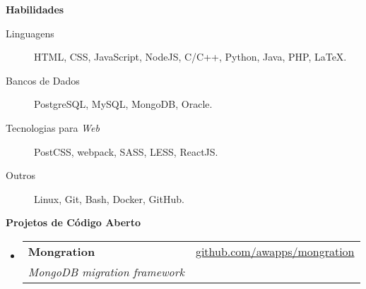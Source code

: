 \documentclass[letterpaper,11pt]{article}
\makeatletter
\newcommand{\resheading}[1]{{\large \colorbox{mygrey}{\begin{minipage}{\textwidth}{\textbf{#1 \vphantom{p\^{E}}}}\end{minipage}}}}
\newcommand{\ressubheading}[4]{
\begin{tabular*}{7.0in}{l@{\extracolsep{\fill}}r}
    \textbf{#1} & #2 \\
    \textit{#3} & \textit{#4} \\
\end{tabular*}\vspace{-6pt}}
\makeatother
\begin{document}
    \resheading{Habilidades}
    \begin{description}
        \item[Linguagens]
            HTML, CSS, JavaScript, NodeJS, C/C++, Python, Java, PHP, \LaTeX.
        \item[Bancos de Dados]
            PostgreSQL, MySQL, MongoDB, Oracle.
        \item[Tecnologias para \textit{Web}]
            PostCSS, webpack, SASS, LESS, ReactJS.
        \item[Outros]
            Linux, Git, Bash, Docker, GitHub.
    \end{description}

    \resheading{Projetos de Código Aberto}
    \begin{itemize}
        \item
            \ressubheading
                {Mongration}
                {\href{https://github.com/awapps/mongration}{github.com/awapps/mongration}}
                {MongoDB migration framework}
                {}
    \end{itemize}
\end{document}

